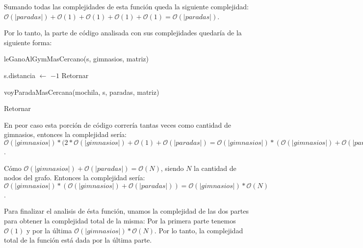 Sumando todas las complejidades de esta función queda la siguiente complejidad: $\mathcal{O}(|paradas|) + \mathcal{O}(1) + \mathcal{O}(1) + \mathcal{O}(1) + \mathcal{O}(1) = \mathcal{O}(|paradas|)$.

Por lo tanto, la parte de código analisada con sus complejidades quedaría de la siguiente forma:

\begin{algorithm}[H]
\label{}
\begin{algorithmic}[]

 

	 

		\State leGanoAlGymMasCercano(s, gimnasios, matriz) 

	 
		\State s.distancia $\leftarrow$ $-1$ 
		\State Retornar 
	
	\Else

		\State voyParadaMasCercana(mochila, s, paradas, matriz) 

	\EndIf

\EndWhile

\State Retornar 

\medskip
\Statex \underline{}
\end{algorithmic}
\end{algorithm}

En peor caso esta porción de código correría tantas veces como cantidad de gimnasios, entonces la complejidad sería: $\mathcal{O}(|gimnasios|)* ( 2*\mathcal{O}(|gimnasios|) + \mathcal{O}(1) + \mathcal{O}(|paradas|) = \mathcal{O}(|gimnasios|) * (\mathcal{O}(|gimnasios|) + \mathcal{O}(|paradas|))$.

Cómo $\mathcal{O}(|gimnasios|) + \mathcal{O}(|paradas|) = \mathcal{O}(N)$, siendo $N$ la cantidad de nodos del grafo. Entonces la complejidad sería: $\mathcal{O}(|gimnasios|) * (\mathcal{O}(|gimnasios|) + \mathcal{O}(|paradas|)) = \mathcal{O}(|gimnasios|) * \mathcal{O}(N)$.

Para finalizar el analisis de ésta función, unamos la complejidad de las dos partes para obtener la complejidad total de la misma: Por la primera parte tenemos $\mathcal{O}(1)$ y por la última $\mathcal{O}(|gimnasios|) * \mathcal{O}(N)$. Por lo tanto, la complejidad total de la función está dada por la última parte.

